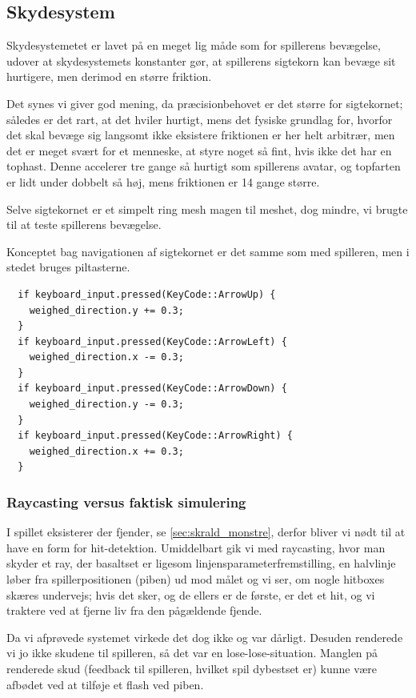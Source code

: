 \subsection{Skydesystem}
Skydesystemetet er lavet på en meget lig måde som for spillerens bevægelse, udover at skydesystemets konstanter gør, at spillerens sigtekorn kan bevæge sit hurtigere, men derimod en større friktion.

Det synes vi giver god mening, da præcisionbehovet er det større for sigtekornet; således er det rart, at det hviler hurtigt, mens det fysiske grundlag for, hvorfor det skal bevæge sig langsomt ikke eksistere friktionen er her helt arbitrær, men det er meget svært for et menneske, at styre noget så fint, hvis ikke det har en tophast. Denne accelerer tre gange så hurtigt som spillerens avatar, og topfarten er lidt under dobbelt så høj, mens friktionen er 14 gange større.

Selve sigtekornet er et simpelt ring mesh magen til meshet, dog mindre, vi brugte til at teste spillerens bevægelse.

Konceptet bag navigationen af sigtekornet er det samme som med spilleren, men i stedet bruges piltasterne.

\begin{verbatim}
  if keyboard_input.pressed(KeyCode::ArrowUp) {
    weighed_direction.y += 0.3;
  }
  if keyboard_input.pressed(KeyCode::ArrowLeft) {
    weighed_direction.x -= 0.3;
  }
  if keyboard_input.pressed(KeyCode::ArrowDown) {
    weighed_direction.y -= 0.3;
  }
  if keyboard_input.pressed(KeyCode::ArrowRight) {
    weighed_direction.x += 0.3;
  }
\end{verbatim}

\subsubsection{Raycasting versus faktisk simulering}\label{sec:raycast}
I spillet eksisterer der fjender, se \autoref{sec:skrald_monstre}, derfor bliver vi nødt til at have en form for hit-detektion. Umiddelbart gik vi med raycasting, hvor man skyder et ray, der basaltset er ligesom linjensparameterfremstilling, en halvlinje løber fra spillerpositionen (piben) ud mod målet og vi ser, om nogle hitboxes skæres undervejs; hvis det sker, og de ellers er de første, er det et hit, og vi traktere ved at fjerne liv fra den pågældende fjende.

Da vi afprøvede systemet virkede det dog ikke og var dårligt. Desuden renderede vi jo ikke skudene til spilleren, så det var en lose-lose-situation. Manglen på renderede skud (feedback til spilleren, hvilket spil dybestset er) kunne være afbødet ved at tilføje et flash ved piben.

